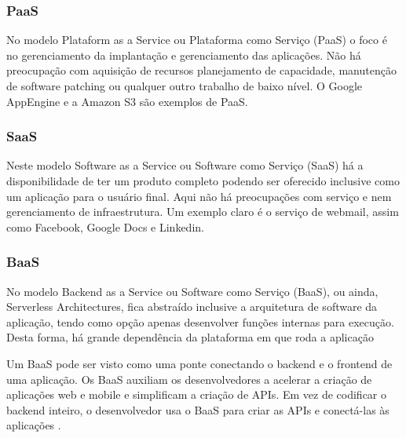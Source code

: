 
\subsubsection{PaaS}\label{paas}

No modelo Plataform as a Service ou Plataforma como Serviço (PaaS)
o foco é no gerenciamento da implantação e gerenciamento das aplicações.
Não há preocupação com aquisição de recursos planejamento de capacidade, manutenção de
software patching ou qualquer outro trabalho de baixo nível. O Google AppEngine e a
Amazon S3 são exemplos de PaaS.

\subsubsection{SaaS}\label{saas}

Neste modelo Software as a Service ou Software como Serviço (SaaS)
há a disponibilidade de ter um produto completo podendo ser oferecido
inclusive como um aplicação para o usuário final. Aqui não há preocupações com serviço
e nem gerenciamento de infraestrutura. Um exemplo claro é o serviço de webmail, assim
como Facebook, Google Docs e Linkedin.

\subsubsection{BaaS}\label{baas}

No modelo Backend as a Service ou Software como Serviço (BaaS), ou ainda,
Serverless Architectures, fica abstraído inclusive a arquitetura de software da aplicação,
tendo como opção apenas desenvolver funções internas para execução. Desta forma, há grande
dependência da plataforma em que roda a aplicação

\begin{citacao}
Um BaaS pode ser visto como uma ponte conectando o backend e o frontend de uma aplicação.
Os BaaS auxiliam os desenvolvedores a acelerar a criação de aplicações web e mobile e
simplificam a criação de APIs. Em vez de codificar o backend inteiro, o desenvolvedor usa
o BaaS para criar as APIs e conectá-las às aplicações \cite{backend-as-a-service-pros-e-contras}.
\end{citacao}
